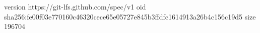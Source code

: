 version https://git-lfs.github.com/spec/v1
oid sha256:fe00f03e770160c46320cece65e05727e845b3ffdfc1614913a26b4c156c19d5
size 196704
